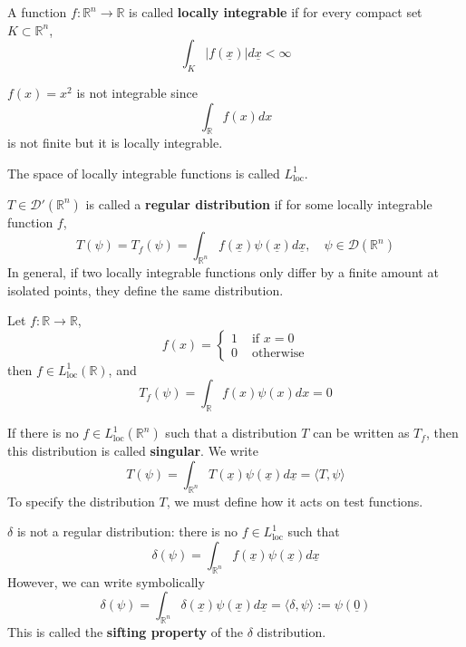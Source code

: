 \begin{definition}
	A function $f: \mathbb{R}^n \rightarrow \mathbb{R}$ is called \textbf{locally integrable} if for every compact set $K \subset \mathbb{R}^n$,
	\[
		\int_K |f(\underline{x})| d\underline{x} < \infty
	\]
\end{definition}

\begin{example}
	$f(x) = x^2$ is not integrable since
	\[
		\int_{\mathbb{R}} f(x) dx
	\]
	is not finite but it is locally integrable.
\end{example}

\begin{definition}
	The space of locally integrable functions is called $L_{\text{loc}}^1$.
\end{definition}

\begin{definition}
	$T \in \mathcal{D}'(\mathbb{R}^n)$ is called a \textbf{regular distribution} if for some locally integrable function $f$,
	\[
		T(\psi) = T_f(\psi) = \int_{\mathbb{R}^n} f(\underline{x}) \psi(\underline{x}) d\underline{x}, \quad \psi \in \mathcal{D}(\mathbb{R}^n)
	\]
	In general, if two locally integrable functions only differ by a finite amount at isolated points, they define the same distribution.
\end{definition}

\begin{example}
	Let $f: \mathbb{R} \rightarrow \mathbb{R}$,
	\[
		f(x) = \begin{cases}
			1 & \text{ if } x = 0 \\
			0 & \text{ otherwise}
		\end{cases}
	\]
	then $f \in L_{\text{loc}}^1 (\mathbb{R})$, and
	\[
		T_f(\psi) = \int_{\mathbb{R}} f(x) \psi(x) dx = 0
	\]
\end{example}

\begin{definition}
	If there is no $f \in L_{\text{loc}}^1 (\mathbb{R}^n)$ such that a distribution $T$ can be written as $T_f$, then this distribution is called \textbf{singular}. We write
	\[
		T(\psi) = \int_{\mathbb{R}^n} T(\underline{x}) \psi(\underline{x}) d\underline{x} = \langle T, \psi \rangle
	\]
	To specify the distribution $T$, we must define how it acts on test functions.
\end{definition}

\begin{example}
	$\delta$ is not a regular distribution: there is no $f \in L_{\text{loc}}^1$ such that
	\[
		\delta(\psi) = \int_{\mathbb{R}^n} f(\underline{x}) \psi(\underline{x}) d\underline{x}
	\]
	However, we can write symbolically
	\[
		\delta(\psi) = \int_{\mathbb{R}^n} \delta(\underline{x}) \psi(\underline{x}) d\underline{x} = \langle \delta, \psi \rangle := \psi(\underline{0})
	\]
	This is called the \textbf{sifting property} of the $\delta$ distribution.
\end{example}

